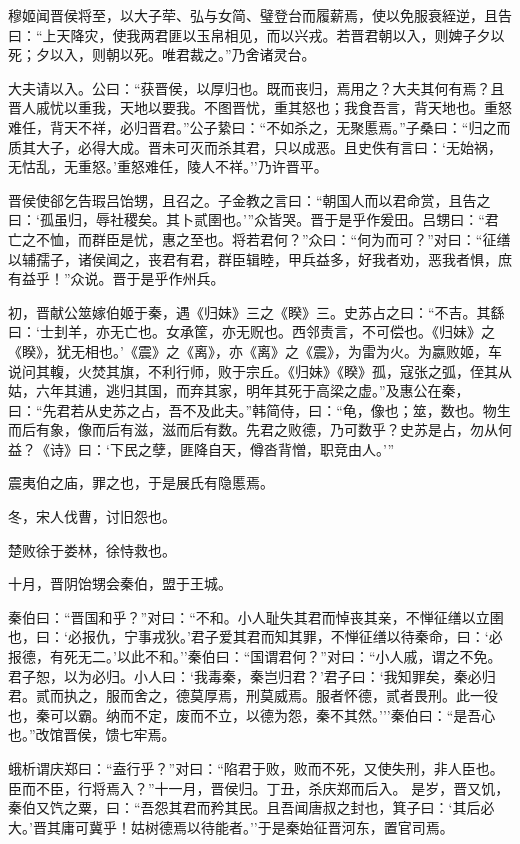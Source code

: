 \documentclass[]{article}
\begin{document}
穆姬闻晋侯将至，以大子荦、弘与女简、璧登台而履薪焉，使以免服衰絰逆，且告曰：``上天降灾，使我两君匪以玉帛相见，而以兴戎。若晋君朝以入，则婢子夕以死；夕以入，则朝以死。唯君裁之。''乃舍诸灵台。

大夫请以入。公曰：``获晋侯，以厚归也。既而丧归，焉用之？大夫其何有焉？且晋人戚忧以重我，天地以要我。不图晋忧，重其怒也；我食吾言，背天地也。重怒难任，背天不祥，必归晋君。''公子絷曰：``不如杀之，无聚慝焉。''子桑曰：``归之而质其大子，必得大成。晋未可灭而杀其君，只以成恶。且史佚有言曰：`无始祸，无怙乱，无重怒。'重怒难任，陵人不祥。''乃许晋平。

晋侯使郤乞告瑕吕饴甥，且召之。子金教之言曰：``朝国人而以君命赏，且告之曰：`孤虽归，辱社稷矣。其卜贰圉也。'''众皆哭。晋于是乎作爰田。吕甥曰：``君亡之不恤，而群臣是忧，惠之至也。将若君何？''众曰：``何为而可？''对曰：``征缮以辅孺子，诸侯闻之，丧君有君，群臣辑睦，甲兵益多，好我者劝，恶我者惧，庶有益乎！''众说。晋于是乎作州兵。

初，晋献公筮嫁伯姬于秦，遇《归妹》三之《睽》三。史苏占之曰：``不吉。其繇曰：`士刲羊，亦无亡也。女承筐，亦无贶也。西邻责言，不可偿也。《归妹》之《睽》，犹无相也。'《震》之《离》，亦《离》之《震》，为雷为火。为嬴败姬，车说问其輹，火焚其旗，不利行师，败于宗丘。《归妹》《睽》孤，寇张之弧，侄其从姑，六年其逋，逃归其国，而弃其家，明年其死于高梁之虚。''及惠公在秦，曰：``先君若从史苏之占，吾不及此夫。''韩简侍，曰：``龟，像也；筮，数也。物生而后有象，像而后有滋，滋而后有数。先君之败德，乃可数乎？史苏是占，勿从何益？《诗》曰：`下民之孽，匪降自天，僔沓背憎，职竞由人。'''

震夷伯之庙，罪之也，于是展氏有隐慝焉。

冬，宋人伐曹，讨旧怨也。

楚败徐于娄林，徐恃救也。

十月，晋阴饴甥会秦伯，盟于王城。

秦伯曰：``晋国和乎？''对曰：``不和。小人耻失其君而悼丧其亲，不惮征缮以立圉也，曰：`必报仇，宁事戎狄。'君子爱其君而知其罪，不惮征缮以待秦命，曰：`必报德，有死无二。'以此不和。''秦伯曰：``国谓君何？''对曰：``小人戚，谓之不免。君子恕，以为必归。小人曰：`我毒秦，秦岂归君？'君子曰：`我知罪矣，秦必归君。贰而执之，服而舍之，德莫厚焉，刑莫威焉。服者怀德，贰者畏刑。此一役也，秦可以霸。纳而不定，废而不立，以德为怨，秦不其然。'''秦伯曰：``是吾心也。''改馆晋侯，馈七牢焉。

蛾析谓庆郑曰：``盍行乎？''对曰：``陷君于败，败而不死，又使失刑，非人臣也。臣而不臣，行将焉入？''十一月，晋侯归。丁丑，杀庆郑而后入。
是岁，晋又饥，秦伯又饩之粟，曰：``吾怨其君而矜其民。且吾闻唐叔之封也，箕子曰：`其后必大。'晋其庸可冀乎！姑树德焉以待能者。''于是秦始征晋河东，置官司焉。
\end{document}
